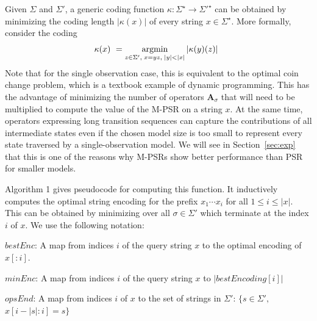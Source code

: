 \documentclass[letterpaper]{article}
\newcommand{\mat}[1]{\mathbf{#1}}
\newcommand{\A}{\mat{A}}
\newcommand{\sstar}{\Sigma^\star}
\DeclareMathOperator*{\argmin}{\rm argmin}
\begin{document}
Given $\Sigma$ and $\Sigma'$, a generic coding function $\kappa : \sstar \to {\Sigma'}^\star$ can be obtained by minimizing the coding length $|\kappa(x)|$ of every string $x \in \sstar$. More formally, consider the coding
\begin{equation*}
\kappa(x) ~= \argmin_{ z \in \Sigma', \; x=yz, \; |y|<|x|} |\kappa(y)(z)| \enspace 
\end{equation*}
Note that for the single observation case, this is equivalent to the optimal coin change problem, which is a textbook example of dynamic programming. This has the advantage of minimizing the number of operators $\A_\sigma$ that will need to be multiplied to compute the value of the M-PSR on a string $x$. At the same time, operators expressing long transition sequences can capture the contributions of all intermediate states even if the chosen model size is too small to represent every state traversed by a single-observation model. We will see in Section~\ref{sec:exp} that this is one of the reasons why M-PSRs show better performance than PSR for smaller models.




%

Algorithm 1 gives pseudocode for computing this function. It inductively computes the optimal string encoding for the prefix $x_1 \cdots x_i$ for all $1 \leq i \leq |x|$. This can be obtained by minimizing over all $\sigma \in \Sigma'$ which terminate at the index $i$ of $x$.
We use the following notation:

$bestEnc$: A map from indices $i$ of the query string $x$ to the optimal encoding of $x[:i]$.

$minEnc$: A map from indices $i$ of the query string $x$ to $|bestEncoding[i]|$

$opsEnd$: A map from indices $i$ of $x$ to the set of strings in $\Sigma'$: $\{s \in \Sigma',$ $x[i-|s|:i] = s\}$
\end{document}
